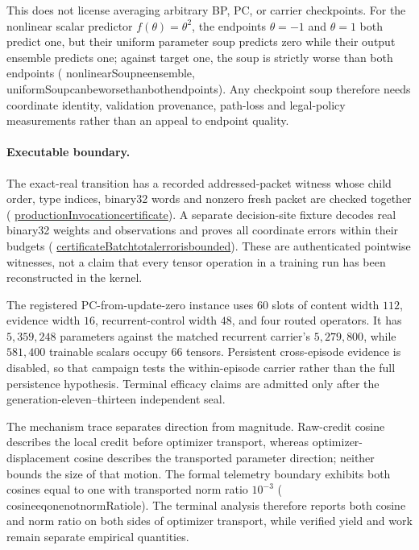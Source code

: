 \documentclass[11pt]{article}
\newcommand{\leanname}[1]{{\scriptsize\ttfamily
  \def\_{\textunderscore\allowbreak}#1}}
\newcommand{\formalcommit}{f3a31db36bb2f944312ee31c1d86c2758109e83a}
\newcommand{\leansource}[3]{%
  \href{https://github.com/zariuq/MeTTapedia/blob/\formalcommit/#1\#L#2}{\leanname{#3}}}
\begin{document}
This does not license averaging arbitrary BP, PC, or carrier checkpoints. For
the nonlinear scalar predictor $f(\theta)=\theta^2$, the endpoints
$\theta=-1$ and $\theta=1$ both predict one, but their uniform parameter soup
predicts zero while their output ensemble predicts one; against target one,
the soup is strictly worse than both endpoints
(\leanname{nonlinearSoup\_ne\_ensemble},
\leanname{uniformSoup\_can\_be\_worse\_than\_both\_endpoints}). Any checkpoint
soup therefore needs coordinate identity, validation provenance, path-loss
and legal-policy measurements rather than an appeal to endpoint quality.

\paragraph{Executable boundary.}
The exact-real transition has a recorded addressed-packet witness whose child order,
type indices, binary32 words and nonzero fresh packet are checked together
(\leansource{lean/mettapedia/Mettapedia/MachineLearning/NeuralNetworks/UnifiedCarrier/MixedRadixAddressTransition.lean}{119-L141}{productionInvocation\_certificate}).
A separate decision-site fixture decodes real binary32 weights and observations and
proves all coordinate errors within their budgets
(\leansource{lean/mettapedia/Mettapedia/MachineLearning/NeuralNetworks/UnifiedCarrier/DecisionSiteFloat32Fixture.lean}{263-L291}{certificateBatch\_total\_error\_is\_bounded}).
These are authenticated pointwise witnesses, not a claim that every tensor operation in
a training run has been reconstructed in the kernel.

The registered PC-from-update-zero instance uses $60$ slots of content width $112$,
evidence width $16$, recurrent-control width $48$, and four routed operators. It has
$5{,}359{,}248$ parameters against the matched recurrent carrier's $5{,}279{,}800$,
while $581{,}400$ trainable scalars occupy $66$ tensors. Persistent cross-episode
evidence is disabled, so that campaign tests the within-episode carrier rather than the
full persistence hypothesis. Terminal efficacy claims are admitted only after the
generation-eleven--thirteen independent seal.

The mechanism trace separates direction from magnitude. Raw-credit cosine describes
the local credit before optimizer transport, whereas optimizer-displacement cosine
describes the transported parameter direction; neither bounds the size of that motion.
The formal telemetry boundary exhibits both cosines equal to one with transported norm
ratio $10^{-3}$
(\leanname{cosine\_eq\_one\_not\_normRatio\_le}). The terminal
analysis therefore reports both cosine and norm ratio on both sides of optimizer
transport, while verified yield and work remain separate empirical quantities.
\end{document}
